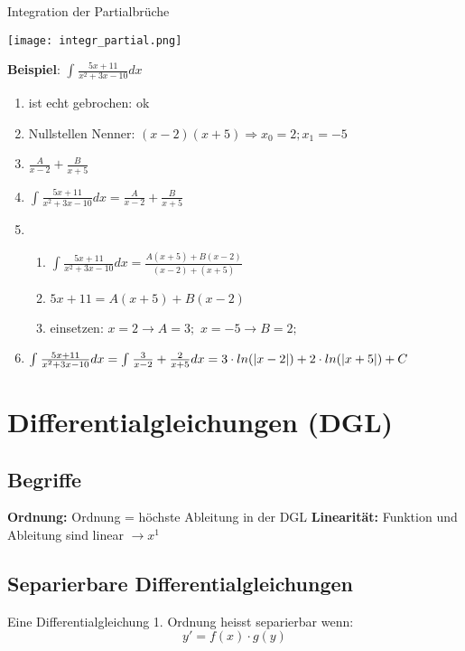 \begin{multicols*}{3}
    { Integration der Partialbrüche}

    \texttt{[image: integr\_partial.png]}

    {\textbf{Beispiel}: \large $\int_{}^{}\frac{5x+11}{x^2+3x-10}dx $ }
    \begin{enumerate}
        \itemsep-0.3em
        \item ist echt gebrochen: ok
        \item Nullstellen Nenner: $ (x-2)(x+5) \Rightarrow x_0 = 2; x_1 = -5$
        \item $ \frac{A}{x-2}+\frac{B}{x+5}$
        \item \large $\int_{}^{}\frac{5x+11}{x^2+3x-10}dx  = \frac{A}{x-2}+\frac{B}{x+5}$
        \item     \begin{enumerate}
                  \itemsep-0.3em
                  \item    $\int_{}^{}\frac{5x+11}{x^2+3x-10}dx = \frac{A(x+5)+B(x-2)}{(x-2) +(x+5) }$
                  \item \small $5x + 11 = A(x+5)+B(x-2) $
                  \item  {\small einsetzen:  $ x = 2 \rightarrow A=3; $ $ x = -5 \rightarrow B=2; $}
              \end{enumerate}
        \item  $\int_{}^{}\frac{5x+11}{x^2+3x-10}dx =\int_{}^{}\frac{3}{x-2}+\frac{2}{x+5}dx  \newline = 3\cdot ln(|x-2|) + 2\cdot ln(|x+5|) + C $
    \end{enumerate}

    \vfill\null
    \newpage
    \section{Differentialgleichungen (DGL)}
    \subsection{Begriffe}
    {\textbf{Ordnung:} Ordnung = höchste Ableitung in der DGL}
    {\textbf{Linearität:} Funktion und Ableitung sind linear $\rightarrow x^1$ }

    \subsection{Separierbare Differentialgleichungen}
    {Eine Differentialgleichung 1. Ordnung heisst separierbar wenn:}
    $$ y' = f(x)\cdot g(y)$$


\end{multicols*}
